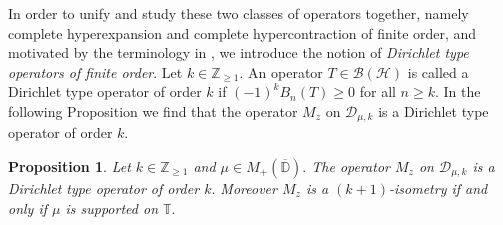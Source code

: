 \documentclass[10pt,oneside,reqno]{amsart}
\newtheorem{proposition}[theorem]{Proposition}
\theoremstyle{definition}
\theoremstyle{remark}
\newcommand{\calB}{{\mathcal{B}}}
\newcommand{\calH}{{\mathcal{H}}}
\renewcommand{\ge}{\geqslant}
\newcommand{\D}{\mathbb D}
\numberwithin{equation}{section}
\begin{document}
In order to unify and study these two classes of operators together, namely complete hyperexpansion and complete hypercontraction of finite order, and motivated by the terminology in \cite[IV, Definition 1.2]{1993multiplication},  we introduce the notion of \textit{Dirichlet type operators of finite order}.  Let $k\in \mathbb Z_{\geqslant 1}.$ An operator $T \in \calB \left( \calH \right)$ is called a Dirichlet type operator of order $k$ if $(-1)^kB_{n} \left( T \right) \ge 0$ for all $n \ge k.$  In the following Proposition we find that the operator $M_z$ on $\mathscr D_{\mu, k}$ is a Dirichlet type operator of order $k.$ 
\begin{proposition}\label{thm:shift-completely-hyperstuff}
 Let $k\in \mathbb Z_{\geqslant 1}$  and $\mu\in M_+(\overline{\D}).$ The operator $M_{z}$ on $\mathscr D_{\mu, k}$ is a Dirichlet type operator of order $k.$ Moreover $M_{z}$ is a $(k+1)$-isometry if and only if $\mu$ is supported on $\mathbb T.$
	    \end{proposition}
\end{document}
